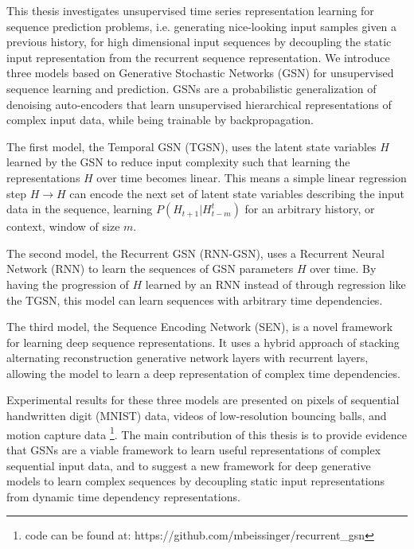 This thesis investigates unsupervised time series representation learning for sequence prediction problems, i.e. generating nice-looking input samples given a previous history, for high dimensional input sequences by decoupling the static input representation from the recurrent sequence representation. We introduce three models based on Generative Stochastic Networks (GSN) for unsupervised sequence learning and prediction. GSNs are a probabilistic generalization of denoising auto-encoders that learn unsupervised hierarchical representations of complex input data, while being trainable by backpropagation.

The first model, the Temporal GSN (TGSN), uses the latent state variables \(H\) learned by the GSN to reduce input complexity such that learning the representations \(H\) over time becomes linear. This means a simple linear regression step \(H \rightarrow H\) can encode the next set of latent state variables describing the input data in the sequence, learning \(P(H_{t+1}|H_{t-m}^t)\) for an arbitrary history, or context, window of size \(m\).

The second model, the Recurrent GSN (RNN-GSN), uses a Recurrent Neural Network (RNN) to learn the sequences of GSN parameters \(H\) over time. By having the progression of \(H\) learned by an RNN instead of through regression like the TGSN, this model can learn sequences with arbitrary time dependencies.

The third model, the Sequence Encoding Network (SEN), is a novel framework for learning deep sequence representations. It uses a hybrid approach of stacking alternating reconstruction generative network layers with recurrent layers, allowing the model to learn a deep representation of complex time dependencies.

Experimental results for these three models are presented on pixels of sequential handwritten digit (MNIST) data, videos of low-resolution bouncing balls, and motion capture data \footnote{code can be found at: https://github.com/mbeissinger/recurrent\_gsn}. The main contribution of this thesis is to provide evidence that GSNs are a viable framework to learn useful representations of complex sequential input data, and to suggest a new framework for deep generative models to learn complex sequences by decoupling static input representations from dynamic time dependency representations.